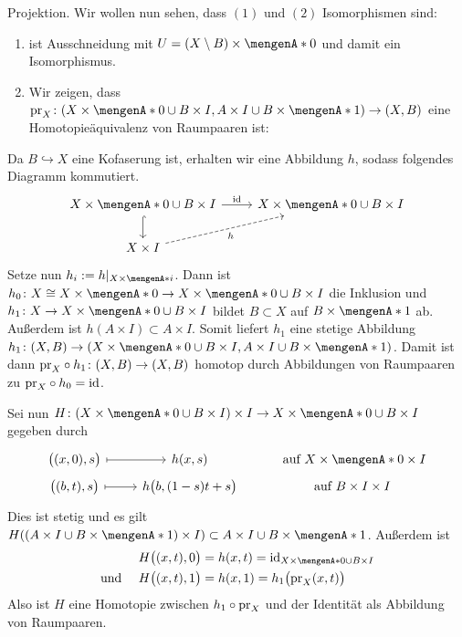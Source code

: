 Projektion. Wir wollen nun sehen, dass $(1)$ und $(2)$ Isomorphismen sind:
\begin{enumerate}[(1)]
	\item ist Ausschneidung mit $U = (X \setminus B) \times \set{0}$ und damit ein Isomorphismus.
	\item Wir zeigen, dass $\pr_X \colon \enbrace*{X \times \set{0} \cup B \times I, A \times I \cup B \times \set{1}} \to (X,B)$ eine Homotopieäquivalenz von Raumpaaren ist:
\end{enumerate}
\begin{beweis}
Da $B \hookrightarrow X$ eine Kofaserung ist, erhalten wir eine Abbildung $h$, sodass folgendes Diagramm kommutiert.
\[
	\begin{tikzcd}
		X \times \set{0} \cup B \times I \dar[hook] \rar["\id"] & X \times \set{0} \cup B \times I \\
		X \times I \urar["h"',dashed] 
	\end{tikzcd}
\]
Setze nun $h_i := h|_{X \times	\set{i}}$. Dann ist $h_0 \colon X \cong X \times \set{0} \to X \times \set{0} \cup B \times I$ die Inklusion und 
$h_1 \colon X \to X \times \set{0} \cup B \times I$ bildet $B \subset X$ auf $B  \times \set{1}$ ab. Außerdem ist $h(A \times I) \subset A \times I$.
Somit liefert $h_1$ eine stetige Abbildung $h_1 \colon (X,B) \to \enbrace*{X \times \set{0} \cup B \times I, A \times I  \cup B \times \set{1}}$. Damit ist dann 
$\mathrm{pr}_X \circ h_1 \colon (X,B) \to (X,B)$ homotop durch Abbildungen von Raumpaaren zu $\mathrm{pr}_X \circ h_0= \operatorname{id}$.

Sei nun $H \colon \enbrace*{X \times \set{0} \cup B \times I} \times I \to X \times \set{0} \cup B \times I$ gegeben durch
\[
	\begin{tikzcd}[row sep=0.2em]
		\enbrace[\big]{(x,0),s} \rar[mapsto] & h(x,s) & \text{ auf } X \times \set{0} \times I \\
		\enbrace[\big]{(b,t),s} \rar[mapsto] & h \enbrace[\big]{b, (1-s)t +s} & \text{auf } B \times I \times I 
	\end{tikzcd}
\]
Dies ist stetig und es gilt $H \enbrace*{ \enbrace*{A \times I \cup B \times \set{1}} \times I } \subset A \times I \cup B \times \set{1}$. Außerdem ist
\begin{align*}
	H \enbrace[\big]{(x,t),0} &= h(x,t) = \id_{X \times \set{0} \cup B \times I } \\
	\text{und } \quad H \enbrace[\big]{(x,t),1} &= h(x,1) = h_1 \enbrace[\big]{\pr_X(x,t)}  
\end{align*}
Also ist $H$ eine Homotopie zwischen $h_1 \circ \mathrm{pr}_X$ und der Identität als Abbildung von Raumpaaren.
\end{beweis}
